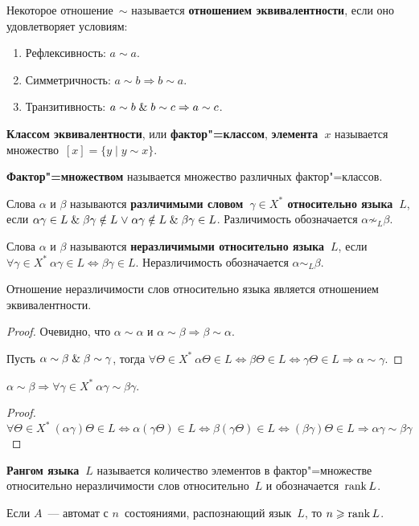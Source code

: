 Некоторое отношение~$\sim$ называется \textbf{отношением эквивалентности}, если оно удовлетворяет условиям:
\begin{enumerate}
	\item Рефлексивность: $a \sim a$.
	\item Симметричность: $a \sim b \Rightarrow b \sim a$.
	\item Транзитивность: $a \sim b \mathrel{\&} b \sim c \Rightarrow a \sim c$.
\end{enumerate}

\textbf{Классом эквивалентности}, или \textbf{фактор"=классом}, \textbf{элемента~$x$} называется множество~$[x] = \{ y \mid y \sim x \}$.

\textbf{Фактор"=множеством} называется множество различных фактор"=классов.

Слова $\alpha$ и $\beta$ называются \textbf{различимыми словом~$\gamma \in X^*$ относительно языка~$L$}, если $\alpha \gamma \in L \mathrel{\&} \beta \gamma \notin L \mathrel{\lor} \alpha \gamma \notin L \mathrel{\&} \beta \gamma \in L$.
Различимость обозначается $\alpha \not\sim_L \beta$.

Слова $\alpha$ и $\beta$ называются \textbf{неразличимыми относительно языка~$L$}, если $\forall \gamma \in X^* \ \alpha \gamma \in L \Leftrightarrow \beta \gamma \in L$.
Неразличимость обозначается $\alpha \sim_L \beta$.

\begin{statement}
Отношение неразличимости слов относительно языка является отношением эквивалентности.
\end{statement}
\begin{proof}
Очевидно, что $\alpha \sim \alpha$ и $\alpha \sim \beta \Rightarrow \beta \sim \alpha$.

Пусть $\alpha \sim \beta \mathrel{\&} \beta \sim \gamma$, тогда $\forall \Theta \in X^* \ 
\alpha \Theta \in L \Leftrightarrow
\beta \Theta \in L \Leftrightarrow
\gamma \Theta \in L \Rightarrow
\alpha \sim \gamma$.
\end{proof}

\begin{statement}
$\alpha \sim \beta \Rightarrow \forall \gamma \in X^* \ \alpha \gamma \sim \beta \gamma$.
\end{statement}
\begin{proof}
\begin{equation*}
\forall \Theta \in X^* \ (\alpha \gamma) \Theta \in L \Leftrightarrow
\alpha (\gamma \Theta) \in L \Leftrightarrow
\beta (\gamma \Theta) \in L \Leftrightarrow
(\beta \gamma) \Theta \in L \Rightarrow
\alpha \gamma \sim \beta \gamma
\end{equation*}
\end{proof}

\textbf{Рангом языка~$L$} называется количество элементов в фактор"=множестве относительно неразличимости слов относительно~$L$ и обозначается~$\operatorname{rank} L$.

\begin{statement}
Если $A$~--- автомат с $n$~состояниями, распознающий язык~$L$, то $n \geqslant \operatorname{rank} L$.
\end{statement}